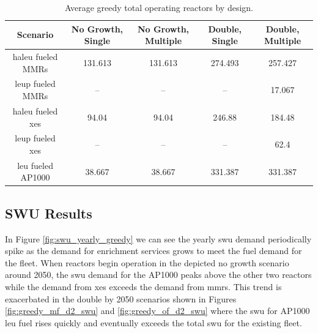 \begin{table}[H]
  \centering
  \caption{Average greedy total operating reactors by design.}
  \label{tab:greedy_reac_avg}
  \begin{tabular}{c c c c c}
     \hline
     Scenario & No Growth, Single & No Growth, Multiple & Double, Single & Double, Multiple  \\
     \hline
     \gls{haleu} fueled MMRs      & 131.613 & 131.613 & 274.493 & 257.427 \\
     \gls{leup} fueled MMRs       & --      & --      & --      & 17.067 \\
     \gls{haleu} fueled \gls{xe}s & 94.04   & 94.04   & 246.88  & 184.48 \\
     \gls{leup} fueled \gls{xe}s  & --      & --      & --      & 62.4 \\
     \gls{leu} fueled AP1000      & 38.667  & 38.667  & 331.387 & 331.387 \\
     \hline
  \end{tabular}
\end{table}




\subsection{SWU Results}
\label{sec:greedy_swu}

In Figure \ref{fig:swu_yearly_greedy} we can see the yearly \gls{swu} demand
periodically spike as the demand for enrichment services grows to meet the fuel
demand for the fleet. When reactors begin operation in the depicted no growth
scenario around 2050, the \gls{swu} demand for the AP1000 peaks above the other
two reactors while the demand from \glspl{xe} exceeds the demand from
\glspl{mmr}. This trend is exacerbated in the double by 2050 scenarios shown in
Figures \ref{fig:greedy_mf_d2_swu} and \ref{fig:greedy_of_d2_swu} where the
\gls{swu} for AP1000 \gls{leu} fuel rises quickly and eventually exceeds the
total \gls{swu} for the existing fleet.



